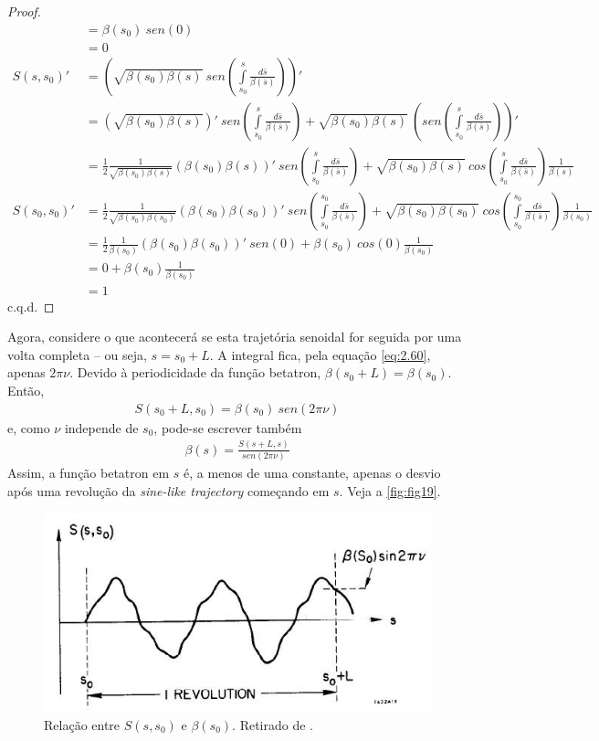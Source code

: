 \begin{proof}
\begin{align*}
				   &= \beta(s_0)\ sen(0)\\
				   &= 0\\
		S(s,s_0)' &= \left(\sqrt{\beta(s_0)\beta(s)}\ sen\left(\int\limits_{s_0}^{s} \frac{d\bar{s}}{\beta(\bar{s})}\right)\right)'\\
				  &= \left(\sqrt{\beta(s_0)\beta(s)}\right)'\ sen\left(\int\limits_{s_0}^{s} \frac{d\bar{s}}{\beta(\bar{s})}\right) + \sqrt{\beta(s_0)\beta(s)}\ \left(sen\left(\int\limits_{s_0}^{s} \frac{d\bar{s}}{\beta(\bar{s})}\right)\right)'\\
				  &= \frac{1}{2}\frac{1}{\sqrt{\beta(s_0)\beta(s)}}(\beta(s_0)\beta(s))'\ sen\left(\int\limits_{s_0}^{s} \frac{d\bar{s}}{\beta(\bar{s})}\right) + \sqrt{\beta(s_0)\beta(s)}\ cos\left(\int\limits_{s_0}^{s} \frac{d\bar{s}}{\beta(\bar{s})}\right) \frac{1}{\beta(s)}\\
		S(s_0,s_0)' &= \frac{1}{2}\frac{1}{\sqrt{\beta(s_0)\beta(s_0)}}(\beta(s_0)\beta(s_0))'\ sen\left(\int\limits_{s_0}^{s_0} \frac{d\bar{s}}{\beta(\bar{s})}\right) + \sqrt{\beta(s_0)\beta(s_0)}\ cos\left(\int\limits_{s_0}^{s_0} \frac{d\bar{s}}{\beta(\bar{s})}\right) \frac{1}{\beta(s_0)}\\
					&= \frac{1}{2}\frac{1}{\beta(s_0)}(\beta(s_0)\beta(s_0))'\ sen(0) + \beta(s_0)\ cos(0) \frac{1}{\beta(s_0)}\\
					&= 0 + \beta(s_0)\frac{1}{\beta(s_0)}\\
					&= 1
	\end{align*}
	c.q.d.
\end{proof}

Agora, considere o que acontecerá se esta trajetória senoidal for seguida por uma volta completa -- ou seja, $s=s_0+L$. A integral fica, pela equação \eqref{eq:2.60}, apenas $2\pi\nu$. Devido à periodicidade da função betatron, $\beta(s_0+L) = \beta(s_0)$. Então,
\begin{align}
	S(s_0+L,s_0) = \beta(s_0)\ sen(2\pi\nu)
\end{align}
e, como $\nu$ independe de $s_0$, pode-se escrever também
\begin{align}
	\beta(s) = \frac{S(s+L,s)}{sen(2\pi\nu)}\label{eq:2.77}
\end{align}
Assim, a função betatron em $s$ é, a menos de uma constante, apenas o desvio após uma revolução da \textit{sine-like trajectory} começando em $s$. Veja a \autoref{fig:fig19}.

\begin{figure}[!htb]
	\centering
	\includegraphics[width=0.8\linewidth]{./Figuras/fig19.jpeg}
	\caption{Relação entre $S(s,s_0)$ e $\beta(s_0)$. Retirado de \cite{sands1970physics}.}
	\label{fig:fig19}
\end{figure}

